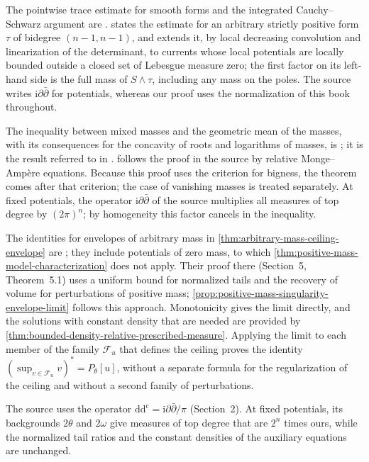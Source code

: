 The pointwise trace estimate for smooth forms and the integrated Cauchy--Schwarz argument are \cite[Lemmas 3.1--3.2 and their proofs]{Popovici2014v1}.  states the estimate for an arbitrary strictly positive form $\tau$ of bidegree $(n-1,n-1)$, and extends it, by local decreasing convolution and linearization of the determinant, to currents whose local potentials are locally bounded outside a closed set of Lebesgue measure zero; the first factor on its left-hand side is the full mass of $S\wedge\tau$, including any mass on the poles. The source writes $\mathrm i\partial\bar\partial$ for potentials, whereas our proof uses the normalization of this book throughout.

The inequality between mixed masses and the geometric mean of the masses, with its consequences for the concavity of roots and logarithms of masses, is \cite[Theorem 6.1 and its proof]{DDNL19log}; it is the result referred to in \cite[Theorem~2.4.1]{XiaSampleBook}.  follows the proof in the source by relative Monge--Amp\`ere equations. Because this proof uses the criterion for bigness, the theorem comes after that criterion; the case of vanishing masses is treated separately. At fixed potentials, the operator $\mathrm i\partial\bar\partial$ of the source multiplies all measures of top degree by $(2\pi)^n$; by homogeneity this factor cancels in the inequality.

The identities for envelopes of arbitrary mass in \cref{thm:arbitrary-mass-ceiling-envelope} are \cite[Theorem 1.2]{PSWZ26}; they include potentials of zero mass, to which \cref{thm:positive-mass-model-characterization} does not apply. Their proof there (Section~5, Theorem~5.1) uses a uniform bound for normalized tails and the recovery of volume for perturbations of positive mass; \cref{prop:positive-mass-singularity-envelope-limit} follows this approach. Monotonicity gives the limit directly, and the solutions with constant density that are needed are provided by \cref{thm:bounded-density-relative-prescribed-measure}. Applying the limit to each member of the family $\mathcal F_u$ that defines the ceiling proves the identity $(\sup_{v\in\mathcal F_u}v)^*=P_\theta[u]$, without a separate formula for the regularization of the ceiling and without a second family of perturbations.

The source uses the operator $\mathrm{dd^c}=\mathrm i\partial\bar\partial/\pi$ (Section~2). At fixed potentials, its backgrounds $2\theta$ and $2\omega$ give measures of top degree that are $2^n$ times ours, while the normalized tail ratios and the constant densities of the auxiliary equations are unchanged.

